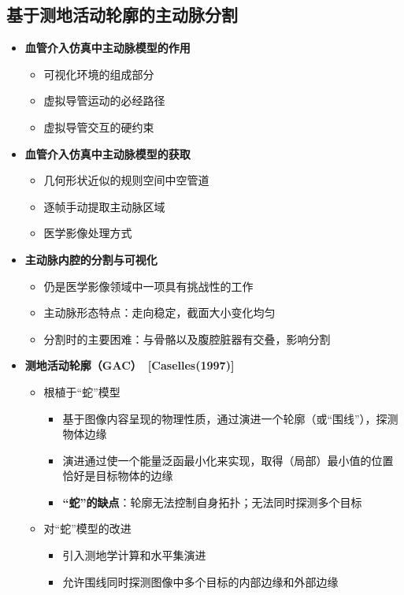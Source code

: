 \subsection[主动脉分割]{基于测地活动轮廓的主动脉分割}

\begin{frame}
\begin{itemize}
\item \textbf{血管介入仿真中主动脉模型的作用}
\begin{itemize}
\item 可视化环境的组成部分
\item 虚拟导管运动的必经路径
\item 虚拟导管交互的硬约束
\end{itemize}
\pause \item \textbf{血管介入仿真中主动脉模型的获取}
\begin{itemize}
\item 几何形状近似的规则空间中空管道
\item 逐帧手动提取主动脉区域
\item 医学影像处理方式
\end{itemize}
\pause \item \textbf{主动脉内腔的分割与可视化}
\begin{itemize}
\item 仍是医学影像领域中一项具有挑战性的工作
\item 主动脉形态特点：走向稳定，截面大小变化均匀
\item 分割时的主要困难：与骨骼以及腹腔脏器有交叠，影响分割
\end{itemize}
\end{itemize}
\end{frame} 

\begin{frame}
\begin{itemize}
\item \textbf{测地活动轮廓（GAC）~[Caselles(1997)]}
\begin{itemize}
\pause \item 根植于“蛇”模型
\begin{itemize}
\item 基于图像内容呈现的物理性质，通过演进一个轮廓（或“围线”），探测物体边缘
\item 演进通过使一个能量泛函最小化来实现，取得（局部）最小值的位置恰好是目标物体的边缘
\item \textbf{“蛇”的缺点}：轮廓无法控制自身拓扑；无法同时探测多个目标
\end{itemize}
\pause \item 对“蛇”模型的改进
\begin{itemize}
\item 引入测地学计算和水平集演进
\item 允许围线同时探测图像中多个目标的内部边缘和外部边缘
\end{itemize}
\end{itemize}
\end{itemize}
\end{frame}

